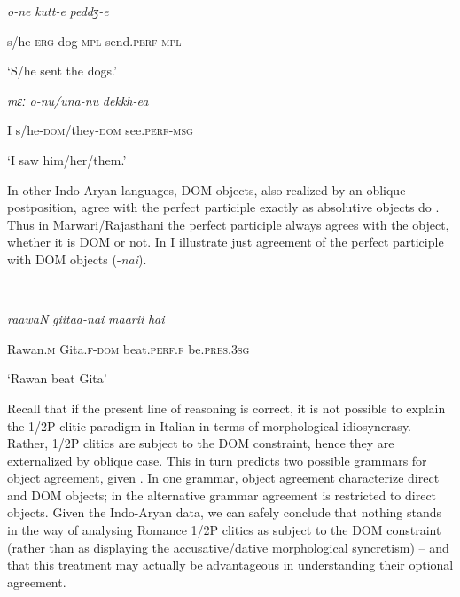 \documentclass[output=paper]{langscibook}
\begin{document}
\ea\label{ex:manzini:18a}  \textit{o-ne}     \textit{kutt-e}     \textit{peddʒ-e}

s/he-\textsc{erg}   dog-\textsc{mpl}   send.\textsc{perf-mpl} 


‘S/he sent the dogs.’  



\ex\label{ex:manzini:18b}  \textit{mɛː}   \textit{o-nu/una-nu}       \textit{dekkh-ea}

I   s/he\textsc{{}-dom}/they\textsc{{}-dom}    see.\textsc{perf-msg}

  ‘I saw him/her/them.’ 
\z 
\z 

In other Indo-Aryan languages, DOM objects, also realized by an oblique postposition, agree with the perfect participle exactly as absolutive objects do \emph{\textup{\citep[342]{Masica1991}}}. Thus in Marwari/Rajasthani the perfect participle always agrees with the object, whether it is DOM or not. In  I illustrate just agreement of the perfect participle with DOM objects (-\textit{nai}).

\ea\label{ex:manzini:}
{}\\
\z

\textit{raawaN}   \textit{giitaa-nai}  \textit{maarii}    \textit{hai}



  Rawan\textsc{.m}   Gita.\textsc{f-dom}   beat.\textsc{perf.f}    be.\textsc{pres.3sg}


  ‘Rawan beat Gita’

Recall that if the present line of reasoning is correct, it is not possible to explain the 1/2P clitic paradigm in Italian in terms of morphological idiosyncrasy. Rather, 1/2P clitics are subject to the DOM constraint, hence they are externalized by oblique case. This in turn predicts two possible grammars for object agreement, given . In one grammar, object agreement characterize direct and DOM objects; in the alternative grammar agreement is restricted to direct objects. Given the Indo-Aryan data, we can safely conclude that nothing stands in the way of analysing Romance 1/2P clitics as subject to the DOM constraint (rather than as displaying the accusative/dative morphological syncretism) – and that this treatment may actually be advantageous in understanding their optional agreement. 
\end{document}
